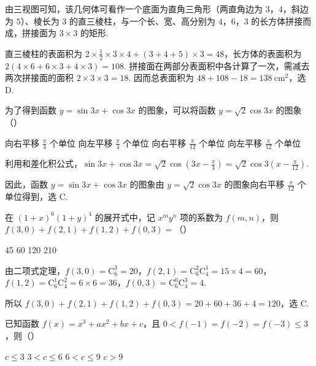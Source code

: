 \begin{solution}
由三视图可知，该几何体可看作一个底面为直角三角形（两直角边为 \(3\)，\(4\)，斜边为 \(5\)）、棱长为 \(3\) 的直三棱柱，与一个长、宽、高分别为 \(4\)，\(6\)，\(3\) 的长方体拼接而成，拼接面为 \(3\times3\) 的矩形.

直三棱柱的表面积为 \(2\times\frac12\times3\times4+(3+4+5)\times3=48\)，长方体的表面积为 \(2(4\times6+6\times3+4\times3)=108\). 拼接面在两部分表面积中各计算了一次，需减去两次拼接面的面积 \(2\times3\times3=18\). 因而总表面积为 \(48+108-18=138\ \mathrm{cm}^{2}\)，选 D.
\end{solution}

\begin{problem}
为了得到函数 \( y = \sin 3x + \cos 3x \) 的图象，可以将函数 \( y = \sqrt{2}\cos 3x \) 的图象（\quad）

\choices
    {向右平移 \(\frac{\pi}{4}\) 个单位}
    {向左平移 \(\frac{\pi}{4}\) 个单位}
    {向右平移 \(\frac{\pi}{12}\) 个单位}
    {向左平移 \(\frac{\pi}{12}\) 个单位}
\end{problem}

\begin{solution}
利用和差化积公式，\(\sin3x+\cos3x=\sqrt{2}\cos\left(3x-\frac\pi4\right)=\sqrt{2}\cos3\left(x-\frac\pi{12}\right)\).

因此，函数 \(y=\sin3x+\cos3x\) 的图象由 \(y=\sqrt{2}\cos3x\) 的图象向右平移 \(\frac\pi{12}\) 个单位得到，选 C.
\end{solution}

\begin{problem}
在 \((1 + x)^6 (1 + y)^4\) 的展开式中，记 \(x^{m}y^n\) 项的系数为 \(f(m,n)\)，则 \(f(3,0) + f(2,1) + f(1,2) + f(0,3) =\)（\quad）

\choices
    {45}
    {60}
    {120}
    {210}
\end{problem}

\begin{solution}
由二项式定理，\(f(3,0)=\mathrm C_6^3=20\)，\(f(2,1)=\mathrm C_6^2\mathrm C_4^1=15\times4=60\)，\(f(1,2)=\mathrm C_6^1\mathrm C_4^2=6\times6=36\)，\(f(0,3)=\mathrm C_6^0\mathrm C_4^3=4\).

所以 \(f(3,0)+f(2,1)+f(1,2)+f(0,3)=20+60+36+4=120\)，选 C.
\end{solution}

\begin{problem}
已知函数 \( f(x) = x^3 + ax^2 + bx + c \)，且 \( 0 < f(-1) = f(-2) = f(-3) \leqslant 3 \)，则（\quad）

\choices
    {\(c \leqslant 3\)}
    {\(3 < c \leqslant 6\)}
    {\(6 < c \leqslant 9\)}
    {\(c > 9\)}
\end{problem}

